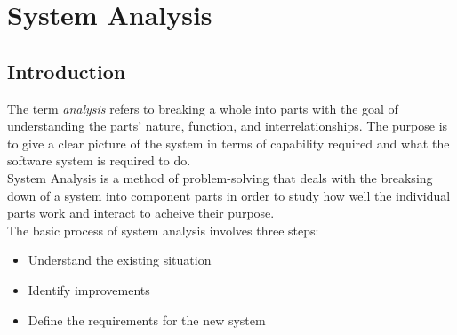 \documentclass[twoside, a4paper, 12pt]{report}
\begin{document}
\chapter{System Analysis}
\section{Introduction}
The term \textit{analysis} refers to breaking a whole into parts with the goal of understanding the parts' nature, function, and interrelationships. The purpose is to give a clear picture of the system in terms of capability required and what the software system is required to do.\autocite{dennis2009systems} \\
\indent
System Analysis is a method of problem-solving that deals with the breaksing down of a system into component parts in order to study how well the individual parts work and interact to acheive their purpose.\\
\indent
The basic process of system analysis involves three steps:
\begin{itemize}
	\item Understand the existing situation
	\item Identify improvements
	\item Define the requirements for the new system
\end{itemize}

\end{document}
